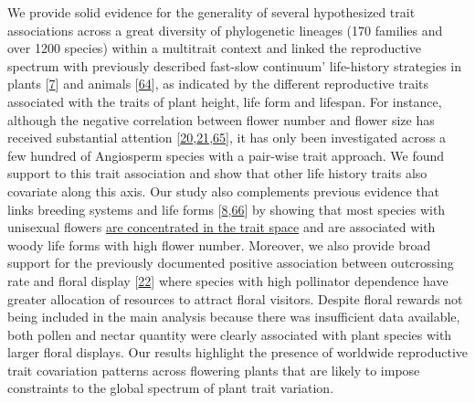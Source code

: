 \documentclass[
  12pt,
  a4paper,
]{article}
\begin{document}
We provide solid evidence for the generality of several hypothesized trait associations across a great diversity of phylogenetic lineages (170 families and over 1200 species) within a multitrait context and linked the reproductive spectrum with previously described fast-slow continuum' life-history strategies in plants {[}\protect\hyperlink{ref-salguero2016}{7}{]} and animals {[}\protect\hyperlink{ref-healy2019}{64}{]}, as indicated by the different reproductive traits associated with the traits of plant height, life form and lifespan. For instance, although the negative correlation between flower number and flower size has received substantial attention {[}\protect\hyperlink{ref-sargent2007}{20},\protect\hyperlink{ref-kettle2011}{21},\protect\hyperlink{ref-worley2000}{65}{]}, it has only been investigated across a few hundred of Angiosperm species with a pair-wise trait approach. We found support to this trait association and show that other life history traits also covariate along this axis. Our study also complements previous evidence that links breeding systems and life forms {[}\protect\hyperlink{ref-friedman2020}{8},\protect\hyperlink{ref-petit2006}{66}{]} by showing that most species with unisexual flowers \href{no\%20pillo\%20esto}{are concentrated in the trait space} and are associated with woody life forms with high flower number. Moreover, we also provide broad support for the previously documented positive association between outcrossing rate and floral display {[}\protect\hyperlink{ref-goodwillie2010}{22}{]} where species with high pollinator dependence have greater allocation of resources to attract floral visitors. Despite floral rewards not being included in the main analysis because there was insufficient data available, both pollen and nectar quantity were clearly associated with plant species with larger floral displays. Our results highlight the presence of worldwide reproductive trait covariation patterns across flowering plants that are likely to impose constraints to the global spectrum of plant trait variation.
\end{document}
